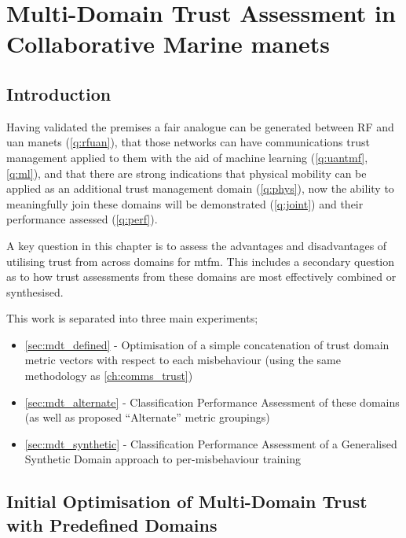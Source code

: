 \def\ChapterTitle{}

\chapter{Multi-Domain Trust Assessment in Collaborative Marine \glspl{manet}}
\label{ch:multi_domain}

\section{Introduction}

Having validated the premises a fair analogue can be generated between RF and \gls{uan} \glspl{manet} (\autoref{q:rfuan}), that those networks can have communications trust management applied to them with the aid of machine learning (\autoref{q:uantmf}, \autoref{q:ml}), and that there are strong indications that physical mobility can be applied as an additional trust management domain (\autoref{q:phys}), now the ability to meaningfully join these domains will be demonstrated (\autoref{q:joint}) and their performance assessed (\autoref{q:perf}).

A key question in this chapter is to assess the advantages and disadvantages of utilising trust from across domains for \gls{mtfm}. 
This includes a secondary question as to how trust assessments from these domains are most effectively combined or synthesised. 

This work is separated into three main experiments;
\begin{itemize}
	\item \autoref{sec:mdt_defined} - Optimisation of a simple concatenation of trust domain metric vectors with respect to each misbehaviour (using the same methodology as \autoref{ch:comms_trust})
	\item \autoref{sec:mdt_alternate} - Classification Performance Assessment of these domains (as well as proposed ``Alternate'' metric groupings)
	\item \autoref{sec:mdt_synthetic} - Classification Performance Assessment of a Generalised Synthetic Domain approach to per-misbehaviour training
\end{itemize}

\section{Initial Optimisation of Multi-Domain Trust with Predefined Domains}\label{sec:mdt_defined}

